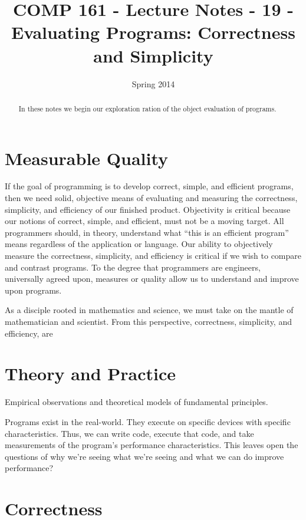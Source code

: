 \documentclass[]{tufte-handout}
\title{COMP 161 - Lecture Notes - 19 - Evaluating Programs: Correctness and Simplicity}
\date{Spring 2014}
\begin{document}
 
\maketitle

\begin{abstract}
In these notes we begin our exploration ration of the object evaluation of programs.   
\end{abstract}

\section{Measurable Quality}

If the goal of programming is to develop correct, simple, and efficient programs, then we need solid, objective means of evaluating and measuring the correctness, simplicity, and efficiency of our finished product. Objectivity is critical because our notions of correct, simple, and efficient, must not be a moving target.  All programmers should, in theory, understand what ``this is an efficient program'' means regardless of the application or language.  Our ability to objectively measure the correctness, simplicity, and efficiency is critical if we wish to compare and contrast programs. To the degree that programmers are engineers, universally agreed upon, measures or quality allow us to understand and improve upon programs.  

As a disciple rooted in mathematics and science, we must take on the mantle of mathematician and scientist.  From this perspective, correctness, simplicity, and efficiency, are 

\section{Theory and Practice}

Empirical observations and theoretical models of fundamental principles.

Programs exist in the real-world. They execute on specific devices with specific characteristics. Thus, we can write code, execute that code, and take measurements of the program's performance characteristics.  This leaves open the questions of why we're seeing what we're seeing and what we can do improve performance? 
 
\section{Correctness} 
\end{document}
